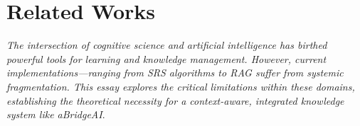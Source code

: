 \section{Related Works}

\textit{The intersection of cognitive science and artificial intelligence has birthed powerful tools for learning and knowledge management. However, current implementations—ranging from SRS algorithms to RAG suffer from systemic fragmentation. This essay explores the critical limitations within these domains, establishing the theoretical necessity for a context-aware, integrated knowledge system like aBridgeAI}.